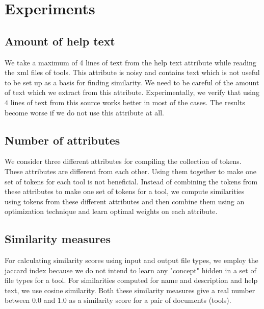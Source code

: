 \chapter{Experiments}
\section{Amount of help text}
We take a maximum of 4 lines of text from the help text attribute while reading the xml files of tools. This attribute is noisy and contains text which is not useful to be set up as a basis for finding similarity. We need to be careful of the amount of text which we extract from this attribute. Experimentally, we verify that using $4$ lines of text from this source works better in most of the cases. The results become worse if we do not use this attribute at all.

\section{Number of attributes}
We consider three different attributes for compiling the collection of tokens. These attributes are different from each other. Using them together to make one set of tokens for each tool is not beneficial. Instead of combining the tokens from these attributes to make one set of tokens for a tool, we compute similarities using tokens from these different attributes and then combine them using an optimization technique and learn optimal weights on each attribute.

\section{Similarity measures}
For calculating similarity scores using input and output file types, we employ the jaccard index because we do not intend to learn any "concept" hidden in a set of file types for a tool. For similarities computed for name and description and help text, we use cosine similarity. Both these similarity measures give a real number between $0.0$ and $1.0$ as a similarity score for a pair of documents (tools).

